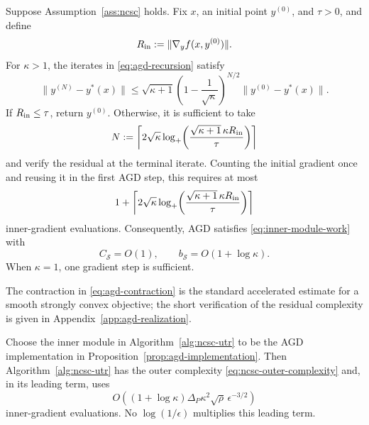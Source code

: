 \begin{proposition}
\label{prop:agd-implementation}
Suppose Assumption~\ref{ass:ncsc} holds.
Fix $x$, an initial point $y^{(0)}$, and $\tau>0$, and define
\[
    R_{\rm in}
    :=
    \|\nabla_yf(x,y^{(0)})\|.
\]
For $\kappa>1$, the iterates in \eqref{eq:agd-recursion} satisfy
\begin{equation}
    \|y^{(N)}-y^*(x)\|
    \le
    \sqrt{\kappa+1}
    \left(
        1-\frac1{\sqrt\kappa}
    \right)^{N/2}
    \|y^{(0)}-y^*(x)\|.
    \label{eq:agd-contraction}
\end{equation}
If $R_{\rm in}\le\tau$, return $y^{(0)}$.
Otherwise, it is sufficient to take
\begin{equation}
    N
    :=
    \left\lceil
        2\sqrt\kappa
        \log_+\!\left(
            \frac{
                \sqrt{\kappa+1}\,\kappa R_{\rm in}
            }{
                \tau
            }
        \right)
    \right\rceil
    \label{eq:agd-iteration-count}
\end{equation}
and verify the residual at the terminal iterate.
Counting the initial gradient once and reusing it in the first AGD
step, this requires at most
\begin{equation}
    1+
    \left\lceil
        2\sqrt\kappa
        \log_+\!\left(
            \frac{
                \sqrt{\kappa+1}\,\kappa R_{\rm in}
            }{
                \tau
            }
        \right)
    \right\rceil
    \label{eq:agd-module-work}
\end{equation}
inner-gradient evaluations.
Consequently, AGD satisfies
\eqref{eq:inner-module-work} with
\[
    C_{\mathcal S}=O(1),
    \qquad
    b_{\mathcal S}=O(1+\log\kappa).
\]
When $\kappa=1$, one gradient step is sufficient.
\end{proposition}

The contraction in
\eqref{eq:agd-contraction} is the standard accelerated estimate for a
smooth strongly convex objective; the short verification of the
residual complexity is given in
Appendix~\ref{app:agd-realization}.

\begin{corollary}
\label{cor:ncsc-agd-realization}
Choose the inner module in Algorithm~\ref{alg:ncsc-utr} to be the AGD
implementation in Proposition~\ref{prop:agd-implementation}.
Then Algorithm~\ref{alg:ncsc-utr} has the outer complexity
\eqref{eq:ncsc-outer-complexity} and, in its leading term, uses
\begin{equation}
    O\!\left(
        (1+\log\kappa)
        \Delta_P\kappa^2\sqrt\rho\,
        \epsilon^{-3/2}
    \right)
    \label{eq:agd-leading-inner}
\end{equation}
inner-gradient evaluations.
No $\log(1/\epsilon)$ multiplies this leading term.
\end{corollary}

